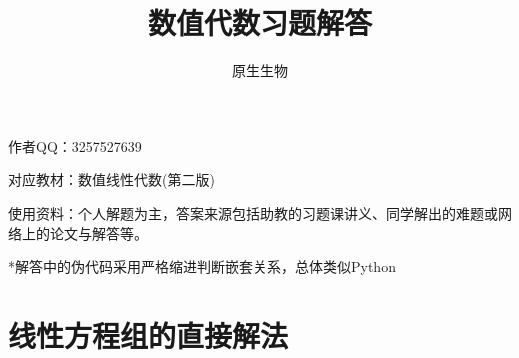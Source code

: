 \documentclass[a4paper,UTF8,fontset=windows]{ctexart}
\title{\heiti 数值代数习题解答}
\author{原生生物}
\date{}
\begin{document}
\maketitle

作者QQ：3257527639

对应教材：数值线性代数(第二版)

使用资料：个人解题为主，答案来源包括助教的习题课讲义、同学解出的难题或网络上的论文与解答等。

*\hspace{0em}解答中的伪代码采用严格缩进判断嵌套关系，总体类似Python

\tableofcontents

\newpage

\section{线性方程组的直接解法}
\end{document}

